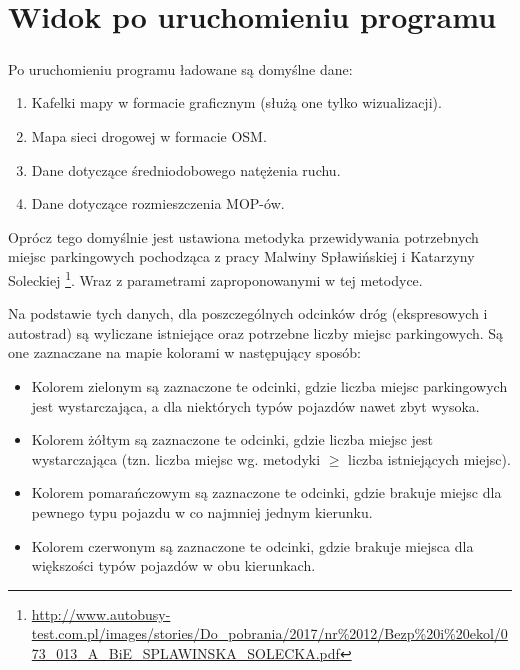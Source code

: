 \documentclass[10pt,paper=a4,footinclude=false,headinclude=false]{scrbook} %
\renewcommand{\contentsname}{Instrukcja obsługi programu Mopnik}
\begin{document}
	
	\tableofcontents 


    \chapter{Widok po uruchomieniu programu}
    \paragraph{}
    Po uruchomieniu programu ładowane są domyślne dane:
    \begin{enumerate}
    \item Kafelki mapy w formacie graficznym (służą one tylko wizualizacji).
    \item Mapa sieci drogowej w formacie OSM.
    \item Dane dotyczące średniodobowego natężenia ruchu.
    \item Dane dotyczące rozmieszczenia MOP-ów.
    \end{enumerate}
    Oprócz tego domyślnie jest ustawiona metodyka przewidywania potrzebnych
    miejsc parkingowych pochodząca z pracy Malwiny Spławińskiej i Katarzyny
    Soleckiej
    \footnote{\url{http://www.autobusy-test.com.pl/images/stories/Do_pobrania/2017/nr\%2012/Bezp\%20i\%20ekol/073_013_A_BiE_SPLAWINSKA_SOLECKA.pdf}}.
        Wraz z parametrami zaproponowanymi w tej metodyce.

    Na podstawie tych danych, dla poszczególnych odcinków dróg (ekspresowych i
    autostrad) są wyliczane istniejące oraz potrzebne liczby miejsc
    parkingowych. Są one zaznaczane na mapie kolorami w następujący sposób:
    \begin{itemize}
      \item Kolorem zielonym są zaznaczone te odcinki, gdzie liczba miejsc
        parkingowych jest wystarczająca, a dla niektórych typów pojazdów nawet
        zbyt wysoka.
      \item Kolorem żółtym są zaznaczone te odcinki, gdzie liczba miejsc jest
        wystarczająca (tzn. liczba miejsc wg. metodyki $\ge$ liczba istniejących
        miejsc).
      \item Kolorem pomarańczowym są zaznaczone te odcinki, gdzie brakuje
        miejsc dla pewnego typu pojazdu w co najmniej jednym kierunku.
      \item Kolorem czerwonym są zaznaczone te odcinki, gdzie brakuje miejsca
        dla większości typów pojazdów w obu kierunkach.
    \end{itemize}
    
\end{document}
